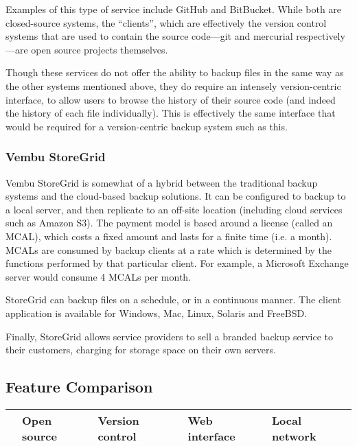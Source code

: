 \begin{bibunit}[plain]
Examples of this type of service include GitHub\cite{Github} and
BitBucket\cite{Bitbucket}. While both are closed-source systems, the
``clients'', which are effectively the version control systems that are used to
contain the source code---git and mercurial respectively---are open source
projects themselves.

Though these services do not offer the ability to backup files in the same way
as the other systems mentioned above, they do require an intensely
version-centric interface, to allow users to browse the history of their source
code (and indeed the history of each file individually). This is effectively
the same interface that would be required for a version-centric backup system
such as this.

\subsubsection{Vembu StoreGrid}

Vembu StoreGrid is somewhat of a hybrid between the traditional backup systems
and the cloud-based backup solutions. It can be configured to backup to a local
server, and then replicate to an off-site location (including cloud services
such as Amazon S3). The payment model is based around a license (called an
MCAL), which costs a fixed amount and lasts for a finite time (i.e. a month).
MCALs are consumed by backup clients at a rate which is determined by the
functions performed by that particular client. For example, a Microsoft
Exchange server would consume 4 MCALs per month.

StoreGrid can backup files on a schedule, or in a continuous manner. The client
application is available for Windows, Mac, Linux, Solaris and FreeBSD.

Finally, StoreGrid allows service providers to sell a branded backup service to
their customers, charging for storage space on their own servers.

\subsection{Feature Comparison}

\begin{table}[H]
    \centering
    \begin{tabular}{ | l | p{1.5cm} | p{1.5cm} | p{1.5cm} | p{1.5cm} | }
        \hline
        & Open source   & Version control   & Web interface & Local network
            \\ \hline


\end{tabular}
\end{table}
\end{bibunit}
